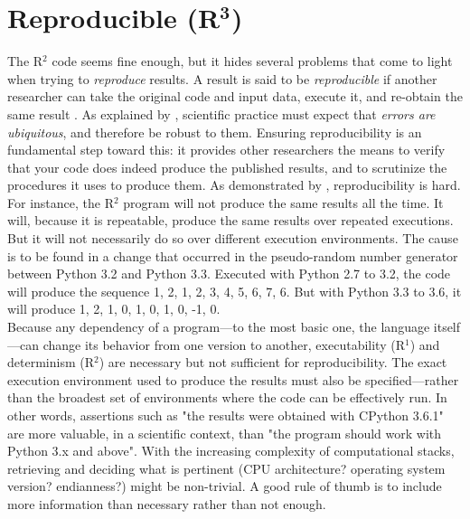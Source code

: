 \documentclass[a4paper,11pt]{article}
\begin{document}
\section*{Reproducible (R$^{\mathbf 3}$)}

The R$^2$ code seems fine enough, but it hides several problems that come to light when trying to {\em reproduce} results. A result is said to be \emph{reproducible} if another researcher can take the original code and input data, execute it, and re-obtain the same result \parencite{Peng:2006}. As explained by \citeauthor{Donoho:2009} \parencite{Donoho:2009}, scientific practice must expect that {\em errors are ubiquitous}, and therefore be robust to them. Ensuring reproducibility is an fundamental step toward this: it provides other researchers the means to verify that your code does indeed produce the published results, and to scrutinize the procedures it uses to produce them. As demonstrated by \citeauthor{Mesnard:2016} \citep{Mesnard:2016}, reproducibility is hard.\\

For instance, the R$^2$ program will not produce the same results all the time. It will, because it is repeatable, produce the same results over repeated executions. But it will not necessarily do so over different execution environments. The cause is to be found in a change that occurred in the pseudo-random number generator between Python 3.2 and Python 3.3. Executed with Python 2.7 to 3.2, the code will produce the sequence 1, 2, 1, 2, 3, 4, 5, 6, 7, 6. But with Python 3.3 to 3.6, it will produce 1, 2, 1, 0, 1, 0, 1, 0, -1, 0.\\

Because any dependency of a program---to the most basic one, the language itself---can change its behavior from one version to another, executability (R$^1$) and determinism (R$^2$) are necessary but not sufficient for reproducibility. The exact execution environment used to produce the results must also be specified---rather than the broadest set of environments where the code can be effectively run. In other words, assertions such as "the results were obtained with CPython 3.6.1" are more valuable, in a scientific context, than "the program should work with Python 3.x and above". With the increasing complexity of computational stacks, retrieving and deciding what is pertinent (CPU architecture? operating system version? endianness?) might be non-trivial. A good rule of thumb is to include more information than necessary rather than not enough.\\
\end{document}
